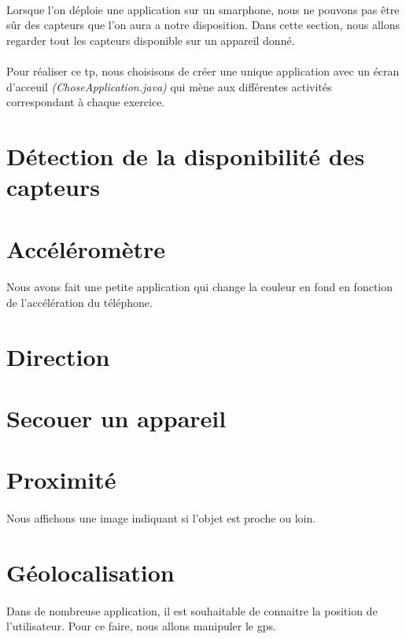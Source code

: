 \documentclass[a4paper]{article}
\begin{document}
\begin{multicols}{2}
            \paragraph{}
                Lorsque l'on déploie une application sur un smarphone, nous ne pouvons pas être sûr des capteurs que l'on aura a notre disposition. Dans cette section, nous allons regarder tout les capteurs disponible sur un appareil donné.
            \paragraph{}
                Pour réaliser ce tp, nous choisisons de créer une unique application avec un écran d'acceuil \emph{(ChoseApplication.java)} qui mène aux différentes activités correspondant à chaque exercice.
        \section{Détection de la disponibilité des capteurs}
        \section{Accéléromètre}
            \paragraph{}
                Nous avons fait une petite application qui change la couleur en fond en fonction de l'accélération du téléphone.
        \section{Direction}
        \section{Secouer un appareil}
        \section{Proximité}
            \paragraph{}
                Nous affichons une image indiquant si l'objet est proche ou loin.
        \section{Géolocalisation}
            \paragraph{}
                Dans de nombreuse application, il est souhaitable de connaitre la position de l'utilisateur. Pour ce faire, nous allons manipuler le gps.

\end{multicols}
\end{document}
